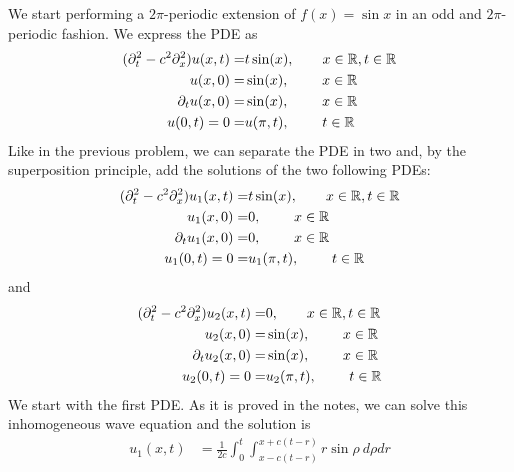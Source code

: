 \begin{questions}

\begin{solution}
We start performing a $2\pi$-periodic extension of $f(x)=\sin{x}$ in an odd and $2\pi$-periodic fashion. We express the PDE as
\begin{align*}
(\partial_t^2 - c^2 \partial_x^2)u(x,t) =& t \sin(x),~~~~~~ x\in\mathbb{R},t\in\mathbb{R} \\
u(x,0)=&\sin(x),~~~~~~~ x\in\mathbb{R}\\
\partial_t u(x,0)=&\sin(x),~~~~~~~ x\in\mathbb{R}\\
u(0,t)=0=&u(\pi,t), ~~~~~~~t\in\mathbb{R} 
\end{align*}
Like in the previous problem, we can separate the PDE in two and, by the superposition principle, add the solutions of the two following PDEs:
\begin{align*}
(\partial_t^2 - c^2 \partial_x^2)u_1(x,t) =& t \sin(x),~~~~~~ x\in\mathbb{R},t\in\mathbb{R} \\
u_1(x,0)=&0,~~~~~~~ x\in\mathbb{R}\\
\partial_t u_1(x,0)=&0,~~~~~~~ x\in\mathbb{R}\\
u_1(0,t)=0=&u_1(\pi,t), ~~~~~~~t\in\mathbb{R} 
\end{align*}
and
\begin{align*}
(\partial_t^2 - c^2 \partial_x^2)u_2(x,t) =& 0,~~~~~~ x\in\mathbb{R},t\in\mathbb{R} \\
u_2(x,0)=&\sin(x),~~~~~~~ x\in\mathbb{R}\\
\partial_t u_2(x,0)=&\sin(x),~~~~~~~ x\in\mathbb{R}\\
u_2(0,t)=0=&u_2(\pi,t), ~~~~~~~t\in\mathbb{R} 
\end{align*}
We start with the first PDE. As it is proved in the notes, we can solve this inhomogeneous wave equation and the solution is
\begin{align*}
u_1(x,t)&=\frac{1}{2c}\int_0^t\int_{x-c(t-r)}^{x+c(t-r)}r\sin{\rho}~d\rho dr\\

\end{align*}
\end{solution}
\end{questions}
